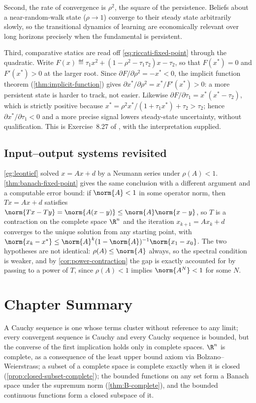 Second, the rate of convergence is $\rho^2$, the square of the persistence.
Beliefs about a near-random-walk state ($\rho\to1$) converge to their steady
state arbitrarily slowly, so the transitional dynamics of learning are
economically relevant over long horizons precisely when the fundamental is
persistent.

Third, comparative statics are read off
\eqref{eq:riccati-fixed-point} through the quadratic. Write
$F(x)\eqdef\tau_1x^2+(1-\rho^2-\tau_1\tau_2)x-\tau_2$, so that $F(x^\ast)=0$ and
$F'(x^\ast)>0$ at the larger root. Since
$\partial F/\partial\rho^2=-x^\ast<0$, the implicit function theorem
(\autoref{thm:implicit-function}) gives
$\partial x^\ast/\partial\rho^2=x^\ast/F'(x^\ast)>0$: a more persistent state is
harder to track, not easier. Likewise
$\partial F/\partial\tau_1=x^\ast(x^\ast-\tau_2)$, which is strictly positive
because $x^\ast=\rho^2x^\ast/(1+\tau_1x^\ast)+\tau_2>\tau_2$; hence
$\partial x^\ast/\partial\tau_1<0$ and a more precise signal lowers
steady-state uncertainty, without qualification. This is Exercise~8.27 of
\textcite[p.~290]{fukuda2026notes}, with the interpretation supplied.

\subsection{Input--output systems revisited}\label{subsec:comp-leontief}

\autoref{eg:leontief} solved $x=Ax+d$ by a Neumann series under
$\rho(A)<1$. \autoref{thm:banach-fixed-point} gives the same conclusion with a
different argument and a computable error bound: if $\norm{A}<1$ in some
operator norm, then $Tx=Ax+d$ satisfies
$\norm{Tx-Ty}=\norm{A(x-y)}\leq\norm{A}\norm{x-y}$, so $T$ is a contraction on
the complete space $\R^n$ and the iteration $x_{k+1}=Ax_k+d$ converges to the
unique solution from any starting point, with
$\norm{x_k-x^\ast}\leq\norm{A}^k(1-\norm{A})^{-1}\norm{x_1-x_0}$. The two
hypotheses are not identical: $\rho(A)\leq\norm{A}$ always, so the spectral
condition is weaker, and by \autoref{cor:power-contraction} the gap is exactly
accounted for by passing to a power of $T$, since $\rho(A)<1$ implies
$\norm{A^N}<1$ for some $N$.

\section{Chapter Summary}\label{sec:comp-summary}

A Cauchy sequence is one whose terms cluster without reference to any limit; every
convergent sequence is Cauchy and every Cauchy sequence is bounded, but the
converse of the first implication holds only in complete spaces. $\R^n$ is
complete, as a consequence of the least upper bound axiom via
Bolzano--Weierstrass; a subset of a complete space is complete exactly when it is
closed (\autoref{prop:closed-subset-complete}); the bounded functions on any set
form a Banach space under the supremum norm (\autoref{thm:B-complete}), and the
bounded continuous functions form a closed subspace of it.

